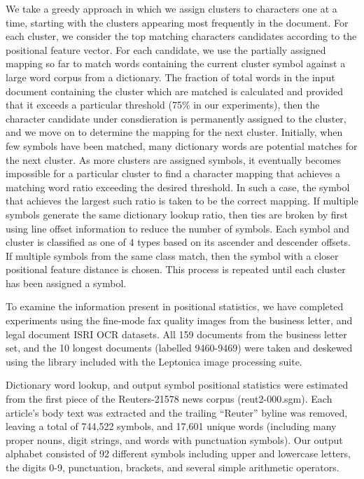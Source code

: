 \documentclass[times, 10pt,twocolumn]{article}
\begin{document}
We take a greedy approach in which we assign clusters to characters
one at a time, starting with the clusters appearing most frequently in
the document.  For each cluster, we consider the top matching
characters candidates according to the positional feature vector.  For
each candidate, we use the partially assigned mapping so far to match
words containing the current cluster symbol against a large word
corpus from a dictionary. The fraction of total words in the input
document containing the cluster which are matched is calculated and
provided that it exceeds a particular threshold (75\% in our
experiments), then the character candidate under consdieration is
permanently assigned to the cluster, and we move on to determine the
mapping for the next cluster.  Initially, when few symbols have been 
matched, many dictionary words are potential matches for the next cluster. 
As more clusters are assigned symbols, it eventually becomes impossible for
a particular cluster to find a character mapping that achieves a
matching word ratio exceeding the desired threshold.  In such a case,
the symbol that achieves the largest such ratio is taken to be the
correct mapping.  If multiple symbols generate the same dictionary
lookup ratio, then ties are broken by first using line offset information 
to reduce the number of symbols.  Each symbol and cluster is classified as
one of 4 types based on its ascender and descender offsets.  If multiple
symbols from the same class match, then the symbol with a closer positional
feature distance is chosen.  This process is repeated until each cluster has 
been assigned a symbol.



To examine the information present in positional statistics, we have completed
experiments using the fine-mode fax quality images from the business letter, 
and legal document ISRI OCR datasets\cite{nartker2005}.  All 159 documents from
the business letter set, and the 10 longest documents (labelled 9460-9469) were
taken and deskewed using the library included with the Leptonica image
processing suite\cite{bloomberg2006}.

Dictionary word lookup, and output symbol positional statistics were estimated
from the first piece of the Reuters-21578 news corpus 
(reut2-000.sgm)\cite{lewis2004}.  Each article's body text was extracted and the
trailing ``Reuter'' byline was removed, leaving a total of 744,522 symbols, and
17,601 unique words (including many proper nouns, digit strings, and words with
punctuation symbols).  Our output alphabet consisted of 92 different symbols
including upper and lowercase letters, the digits 0-9, punctuation, brackets, 
and several simple arithmetic operators.
\end{document}
